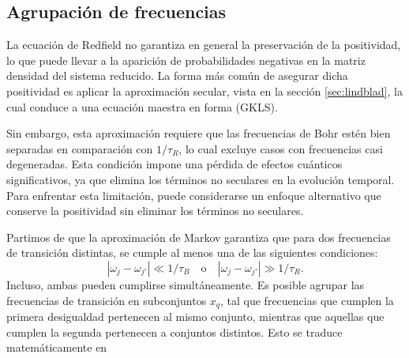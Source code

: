 \subsection{Agrupación de frecuencias}
La ecuación de Redfield no garantiza en general la preservación de la positividad, lo que puede llevar a la aparición de probabilidades negativas en la matriz densidad del sistema reducido. La forma más común de asegurar dicha positividad es aplicar la aproximación secular, vista en la sección \ref{sec:lindblad}, la cual conduce a una ecuación maestra en forma (GKLS).

Sin embargo, esta aproximación requiere que las frecuencias de Bohr estén bien separadas en comparación con \( 1/\tau_R \), lo cual excluye casos con frecuencias casi degeneradas. Esta condición impone una pérdida de efectos cuánticos significativos, ya que elimina los términos no seculares en la evolución temporal\cite{trushechkin2021unified}. Para enfrentar esta limitación, puede considerarse un enfoque alternativo que conserve la positividad sin eliminar los términos no seculares. 

Partimos de que la aproximación de Markov garantiza que para dos frecuencias de transición distintas, se cumple al menos una de las siguientes condiciones:
\[
|\omega_j - \omega_{j'}| \ll 1/\tau_B \quad \text{o} \quad |\omega_j - \omega_{j'}| \gg 1/\tau_R.
\]
Incluso, ambas pueden cumplirse simultáneamente. Es posible agrupar las frecuencias de transición en subconjuntos \( x_q \), tal que frecuencias que cumplen la primera desigualdad pertenecen al mismo conjunto, mientras que aquellas que cumplen la segunda pertenecen a conjuntos distintos. Esto se traduce matemáticamente en


